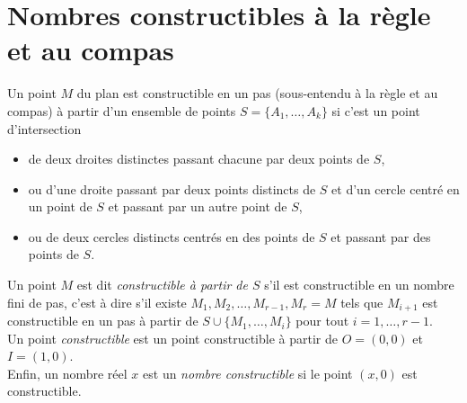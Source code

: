 \documentclass[a4paper,11pt,reqno]{amsart}
\begin{document}
\section{Nombres constructibles à la règle et au compas}


\begin{convention}\small
  Un point $M$ du plan est constructible en un pas (sous-entendu à la règle et au compas) à partir d'un ensemble de points $S=\{A_1,\ldots,A_k\}$ si c'est un point d'intersection
  \begin{itemize}
    \item de deux droites distinctes passant chacune par deux points de $S$,
    \item ou d'une droite passant par deux points distincts de $S$ et d'un cercle centré en un point de $S$ et passant par un autre point de $S$,
    \item ou de deux cercles distincts centrés en des points de $S$ et passant par des points de $S$.
  \end{itemize}

  Un point $M$ est dit \emph{constructible à partir de $S$} s'il est constructible en un nombre fini de pas, c'est à dire s'il existe $M_1,M_2,\ldots,M_{r-1},M_r=M$ tels que $M_{i+1}$ est constructible en un pas à partir de $S \cup \{M_1,\ldots,M_{i}\}$ pour tout $i=1,\ldots,r-1$.\\
  Un point \emph{constructible} est un point constructible à partir de $O=(0,0)$ et $I=(1,0)$.\\
  Enfin, un nombre réel $x$ est un \emph{nombre constructible} si le point $(x,0)$ est constructible.
\end{convention}
\end{document}
